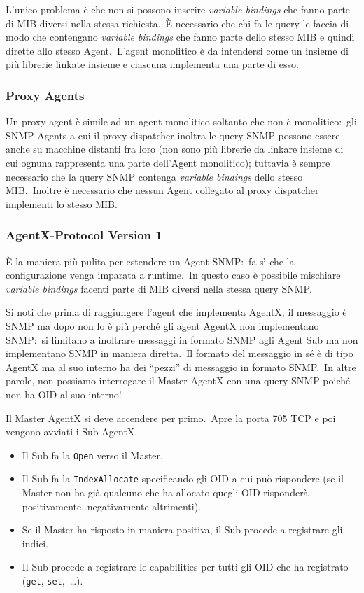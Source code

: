 L'unico problema è che non si possono inserire \textit{variable bindings} che fanno parte di MIB diversi nella stessa richiesta.\
È necessario che chi fa le query le faccia di modo che contengano \textit{variable bindings} che fanno parte dello stesso MIB e quindi dirette allo stesso Agent.\
L'agent monolitico è da intendersi come un insieme di più librerie linkate insieme e ciascuna implementa una parte di esso.\

\subsubsection{Proxy Agents}

Un proxy agent è simile ad un agent monolitico soltanto che non è monolitico:\ gli SNMP Agents a cui il proxy dispatcher inoltra le query SNMP possono essere anche su macchine distanti fra loro (non sono più librerie da linkare insieme di cui ognuna rappresenta una parte dell'Agent monolitico); tuttavia è sempre necessario che la query SNMP contenga \textit{variable bindings} dello stesso MIB.\
Inoltre è necessario che nessun Agent collegato al proxy dispatcher implementi lo stesso MIB.\

\subsubsection{AgentX-Protocol Version 1}

È la maniera più pulita per estendere un Agent SNMP:\ fa sì che la configurazione venga imparata a runtime.\
In questo caso è possibile mischiare \textit{variable bindings} facenti parte di MIB diversi nella stessa query SNMP.\

Si noti che prima di raggiungere l'agent che implementa AgentX, il messaggio è SNMP ma dopo non lo è più perché gli agent AgentX non implementano SNMP:\ si limitano a inoltrare messaggi in formato SNMP agli Agent Sub ma non implementano SNMP in maniera diretta.\
Il formato del messaggio in sé è di tipo AgentX ma al suo interno ha dei ``pezzi'' di messaggio in formato SNMP.\
In altre parole, non possiamo interrogare il Master AgentX con una query SNMP poiché non ha OID al suo interno!\

Il Master AgentX si deve accendere per primo.\
Apre la porta 705 TCP e poi vengono avviati i Sub AgentX.
\begin{itemize}
    \item Il Sub fa la \texttt{Open} verso il Master.
    \item Il Sub fa la \texttt{IndexAllocate} specificando gli OID a cui può rispondere (se il Master non ha già qualcuno che ha allocato quegli OID risponderà positivamente, negativamente altrimenti).
    \item Se il Master ha risposto in maniera positiva, il Sub procede a registrare gli indici.
    \item Il Sub procede a registrare le capabilities per tutti gli OID che ha registrato (\texttt{get}, \texttt{set},\ \dots).
\end{itemize}

